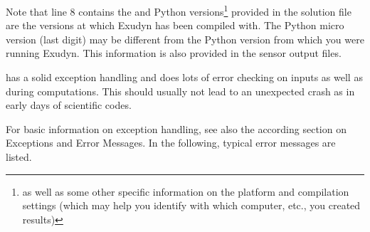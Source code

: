 Note that line 8 contains the \codeName and Python versions\footnote{as well as some other specific information on the platform and compilation settings (which may help you identify with which computer, etc., you created results)} provided in the solution file are the versions at which Exudyn has been compiled with.
The Python micro version (last digit) may be different from the Python version from which you were running Exudyn.
This information is also provided in the sensor output files.
%
\newpage
{}

\codeName has a solid exception handling and does lots of error checking on
inputs as well as during computations. This should usually not lead to an
unexpected crash as in early days of scientific codes.

For basic information on exception handling, see also the according section on
Exceptions and Error Messages. In the following, typical error messages are listed. 

